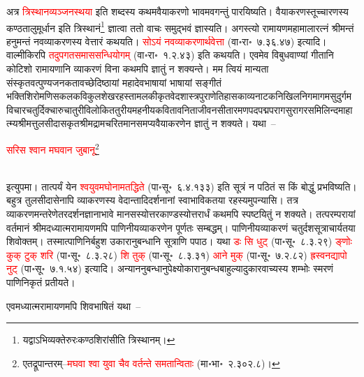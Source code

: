 \begin{sloppypar}\justifying\noindent अत्र \textcolor{red}{त्रि\-स्थान\-व्यञ्जनस्थया} इति शब्दस्य कथमवैयाकरणो भावमवगन्तुं पारयिष्यति। वैयाकरणस्तूच्चारणस्य कण्ठ\-तालु\-मूर्धान इति त्रि\-स्थानं\footnote{यद्वाऽभि\-व्यक्तेरुरःकण्ठ\-शिरांसीति त्रिस्थानम्।} ज्ञात्वा ततो वाचः समुद्भवं ज्ञास्यति। अगस्त्यो रामायण\-महामाला\-रत्नं श्रीमन्तं हनुमन्तं नव\-व्याकरणस्य वेत्तारं कथयति। \textcolor{red}{सोऽयं नव\-व्याकरणार्थवेत्ता} (वा॰रा॰~७.३६.४७) इत्यादि। वाल्मीकिरपि \textcolor{red}{तदुपगत\-समास\-सन्धि\-योगम्} (वा॰रा॰~१.२.४३) इति कथयति। एवमेव विबुध\-वाण्यां गीतानि कोटिशो रामायणानि व्याकरणं विना कथमपि ज्ञातुं न शक्यन्ते। मम त्वियं मान्यता संस्कृतवत्पुण्य\-जनकतावच्छेदिष्ठायां महादेव\-भाषायां भाषायां सङ्गीतं भक्ति\-शिरोमणि\-सकल\-कवि\-कुल\-शेखर\-हस्तामलकीकृत\-वेद\-शास्त्र\-पुराणेतिहास\-काव्य\-नाटक\-निखिल\-निगमागम\-सुदुर्गम\-विचार\-चतुर्दिक्चारु\-चातुरी\-विलोकित\-तुरीय\-महनीय\-कविता\-वनिता\-जीवन\-सीता\-रमण\-पद\-पद्म\-पराग\-सुराग\-रसमिलिन्द\-माहात्म्य\-श्रीमत्तुलसीदास\-कृत\-श्रीमद्राम\-चरित\-मानसमप्यवैयाकरणेन ज्ञातुं न शक्यते। यथा~–\end{sloppypar}
\centering\textcolor{red}{सरिस श्वान मघवान जुबानू}\footnote{एतद्रूपान्तरम्–\textcolor{red}{मघवा श्वा युवा चैव वर्तन्ते समतान्विताः} (मा॰भा॰~२.३०२.८)।}\nopagebreak\\
\\
\begin{sloppypar}\justifying\noindent इत्युपमा। तात्पर्यं येन \textcolor{red}{श्व\-युव\-मघोनामतद्धिते} (पा॰सू॰~६.४.१३३) इति सूत्रं न पठितं स किं बोद्धुं प्रभविष्यति। बहुत्र तुलसीदासेनापि व्याकरणस्य वेदान्तादि\-दर्शनानां स्वाभाविकतया रहस्यमुपन्यासि। तत्र व्याकरणमन्तरेणेतर\-दर्शन\-ज्ञानाभावे मानसस्योत्तर\-काण्डस्योत्तरार्धं कथमपि स्पष्टयितुं न शक्यते। तत्परम्परायां वर्तमानं श्रीमदध्यात्म\-रामायणमपि पाणिनीय\-व्याकरणेन पूर्णतः सम्बद्धम्। पाणिनीय\-व्याकरणं चतुर्दश\-सूत्राचार्यतया शिवोक्तम्। तस्मात्पाणिनिर्बहुश उकारानु\-बन्धानि सूत्राणि पपाठ। यथा \textcolor{red}{डः सि धुट्} (पा॰सू॰~८.३.२९) \textcolor{red}{ङ्णोः कुक् टुक् शरि} (पा॰सू॰~८.३.२८) \textcolor{red}{शि तुक्} (पा॰सू॰~८.३.३१) \textcolor{red}{आने मुक्} (पा॰सू॰~७.२.८२) \textcolor{red}{ह्रस्वनद्यापो नुट्} (पा॰सू॰~७.१.५४) इत्यादि। अन्याननु\-बन्धानुपेक्ष्योकारानुबन्ध\-बाहुल्यादुकार\-वाच्यस्य शम्भोः स्मरणं पाणिनि\-कृतं प्रतीयते।\end{sloppypar}
\begin{sloppypar}\justifying\noindent\hspace{10mm} एवमध्यात्म\-रामायणमपि शिव\-भाषितं यथा~–\end{sloppypar}
